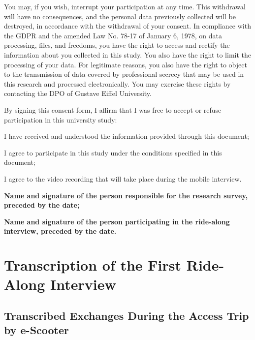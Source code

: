 You may, if you wish, interrupt your participation at any time. This withdrawal will have no consequences, and the personal data previously collected will be destroyed, in accordance with the withdrawal of your consent. In compliance with the \acrfull{GDPR} and the amended Law No. 78-17 of January 6, 1978, on data processing, files, and freedoms, you have the right to access and rectify the information about you collected in this study. You also have the right to limit the processing of your data. For legitimate reasons, you also have the right to object to the transmission of data covered by professional secrecy that may be used in this research and processed electronically. You may exercise these rights by contacting the \acrfull{DPO} of Gustave Eiffel University.%

By signing this consent form, I affirm that I was free to accept or refuse participation in this university study:
\begin{customitemize}
    \item I have received and understood the information provided through this document;
    \item I agree to participate in this study under the conditions specified in this document;
    \item I agree to the video recording that will take place during the mobile interview.
\end{customitemize}%

\begin{customitemize}
    \item \textbf{Name and signature of the person responsible for the research survey, preceded by the date;}
    \item \textbf{Name and signature of the person participating in the ride-along interview, preceded by the date.}
\end{customitemize}%

    \newpage
\section{Transcription of the First Ride-Along Interview}
    \label{annexes:retranscription-pcte1}

\subsection{Transcribed Exchanges During the Access Trip by e-Scooter}
 
